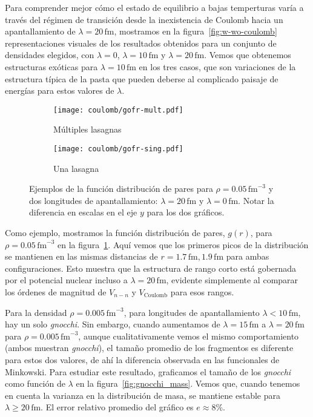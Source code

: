 Para comprender mejor cómo el estado de equilibrio a bajas temperturas varía a través del régimen de transición desde la inexistencia de Coulomb hacia un apantallamiento de $\lambda=20\,\text{fm}$, mostramos en la figura~\ref{fig:w-wo-coulomb} representaciones visuales de los resultados obtenidos para un conjunto de densidades elegidos, con $\lambda=0$, $\lambda=10\,\text{fm}$ y $\lambda=20\,\text{fm}$.
Vemos que obtenemos estructuras exóticas para $\lambda=10\,\text{fm}$ en los tres casos, que son variaciones de la estructura típica de la pasta que pueden deberse al complicado paisaje de energías para estos valores de $\lambda$.

\begin{figure}[h!]  %
\centering
\begin{subfigure}[h!]{0.4\columnwidth}
  \centering
  \texttt{[image: coulomb/gofr-mult.pdf]}
  \caption{Múltiples lasagnas}
\end{subfigure}
\begin{subfigure}[h!]{0.4\columnwidth}
  \centering
  \texttt{[image: coulomb/gofr-sing.pdf]}
  \caption{Una lasagna}
\end{subfigure}
\caption{Ejemplos de la función distribución de pares para $\rho=0.05\,\text{fm}^{-3}$ y dos longitudes de apantallamiento:
  $\lambda=20\,\text{fm}$ y $\lambda=0\,\text{fm}$.
  Notar la diferencia en escalas en el eje $y$ para los dos gráficos.}
\label{fig:gofr}
\end{figure}

Como ejemplo, mostramos la función distribución de pares, $g(r)$, para $\rho=0.05\,\text{fm}^{-3}$ en la figura~\ref{fig:gofr}.
Aquí vemos que los primeros picos de la distribución se mantienen en las mismas distancias de $r=1.7\,\text{fm}, 1.9\,\text{fm}$ para ambas configuraciones.
Esto muestra que la estructura de rango corto está gobernada por el potencial nuclear incluso a $\lambda=20\,\text{fm}$, evidente simplemente al comparar los órdenes de magnitud de $V_{n-n}$ y $V_{\text{Coulomb}}$ para esos rangos.

Para la densidad $\rho=0.005\,\text{fm}^{-3}$, para longitudes de apantallamiento $\lambda<10\,\text{fm}$, hay un solo \emph{gnocchi}.
Sin embargo, cuando aumentamos de $\lambda=15\,\text{fm}$ a $\lambda=20\,\text{fm}$ para $\rho=0.005\,\text{fm}^{-3}$, aunque cualitativamente vemos el mismo comportamiento (ambos muestran \emph{gnocchi}), el tamaño promedio de los fragmentos es diferente para estos dos valores, de ahí la diferencia observada en las funcionales de Minkowski.
Para estudiar este resultado, graficamos el tamaño de los \emph{gnocchi} como función de $\lambda$ en la figura~\ref{fig:gnocchi_mass}.
Vemos que, cuando tenemos en cuenta la varianza en la distribución de masa, se mantiene estable para $\lambda\geq20\,\text{fm}$.
El error relativo promedio del gráfico es $e\approx8\%$.

